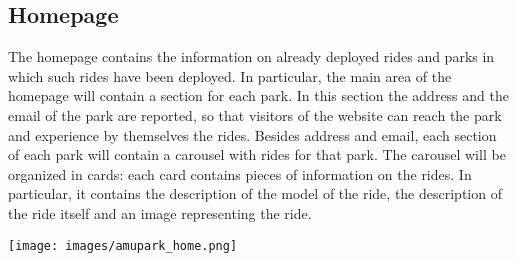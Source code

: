 \subsection{Homepage}
The homepage contains the information on already deployed rides and parks in which such rides have been deployed. In particular, the main area of the homepage will contain a section for each park. In this section the address and the email of the park are reported, so that visitors of the website can reach the park and experience by themselves the rides. Besides address and email, each section of each park will contain a carousel with rides for that park. The carousel will be organized in cards: each card contains pieces of information on the rides. In particular, it contains the description of the model of the ride, the description of the ride itself and an image representing the ride.

\texttt{[image: images/amupark\_home.png]}